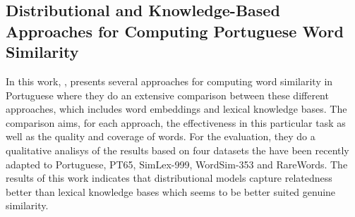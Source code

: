 \subsection{Distributional and Knowledge-Based Approaches for Computing Portuguese Word Similarity}

In this work, , presents several approaches for computing word similarity in Portuguese where they do an extensive comparison between these different approaches, which includes word embeddings and lexical knowledge bases. The comparison aims, for each approach, the effectiveness in this particular task as well as the quality and coverage of words. For the evaluation, they do a qualitative analisys of the results based on four datasets the have been recently adapted to Portuguese, PT65, SimLex-999, WordSim-353 and RareWords.
The results of this work indicates that distributional models capture relatedness better than lexical knowledge bases which seems to be better suited genuine similarity.
